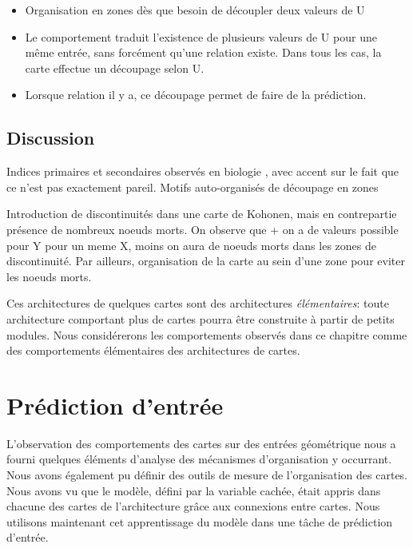 \documentclass[../main]{subfiles}
\begin{document}
\begin{itemize}
	\item Organisation en zones dès que besoin de découpler deux valeurs de U
	\item Le comportement traduit l'existence de plusieurs valeurs de U pour une même entrée, sans forcément qu'une relation existe. Dans tous les cas, la carte effectue un découpage selon U.
	\item Lorsque relation il y a, ce découpage permet de faire de la prédiction.
\end{itemize}

\subsection{Discussion}

Indices primaires et secondaires observés en biologie \cite{ballard_cortical_1986}, avec accent sur le fait que ce n'est pas exactement pareil. 
Motifs auto-organisés de découpage en zones

Introduction de discontinuités dans une carte de Kohonen, mais en contrepartie présence de nombreux noeuds morts.
On observe que + on a de valeurs possible pour Y pour un meme X, moins on aura de noeuds morts dans les zones de discontinuité. 
Par ailleurs, organisation de la carte au sein d'une zone pour eviter les noeuds morts.

Ces architectures de quelques cartes sont des architectures \emph{élémentaires}: toute architecture comportant plus de cartes pourra être construite à partir de petits modules. Nous considérerons les comportements observés dans ce chapitre comme des comportements élémentaires des architectures de cartes.



\section{Prédiction d'entrée}

L'observation des comportements des cartes sur des entrées géométrique nous a fourni quelques éléments d'analyse des mécanismes d'organisation y occurrant. 
Nous avons également pu définir des outils de mesure de l'organisation des cartes.
Nous avons vu que le modèle, défini par la variable cachée, était appris dans chacune des cartes de l'architecture grâce aux connexions entre cartes.
Nous utilisons maintenant cet apprentissage du modèle dans une tâche de prédiction d'entrée.
\end{document}
